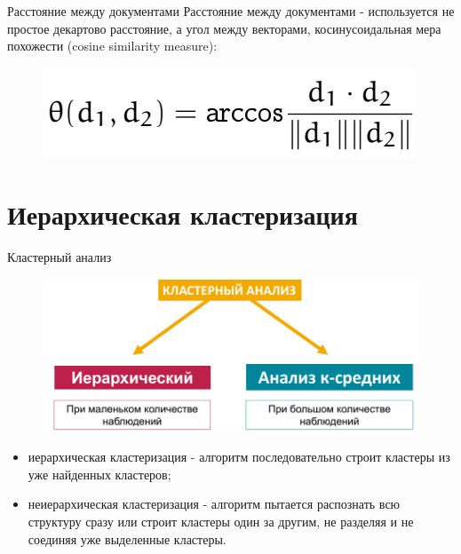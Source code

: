 \documentclass{beamer}
\begin{document}
\begin{frame}{Расстояние между документами}
Расстояние между документами - используется не простое декартово расстояние, а угол между векторами, косинусоидальная мера похожести (cosine similarity measure):
\begin{figure}[h]
\centering
\includegraphics[scale=0.4]{images/lec07-pic14.png}
\end{figure}
\end{frame}

\section{Иерархическая кластеризация}

\begin{frame}{Кластерный анализ}
\begin{figure}[h]
\centering
\includegraphics[scale=0.5]{images/lec07-pic15.png}
\end{figure}
\begin{itemize}
\item иерархическая кластеризация - алгоритм последовательно строит кластеры из уже найденных кластеров;
\item неиерархическая кластеризация - алгоритм пытается распознать всю структуру сразу или строит кластеры один за другим, не разделяя и не соединяя уже выделенные кластеры.
\end{itemize}
\end{frame}
\end{document}
